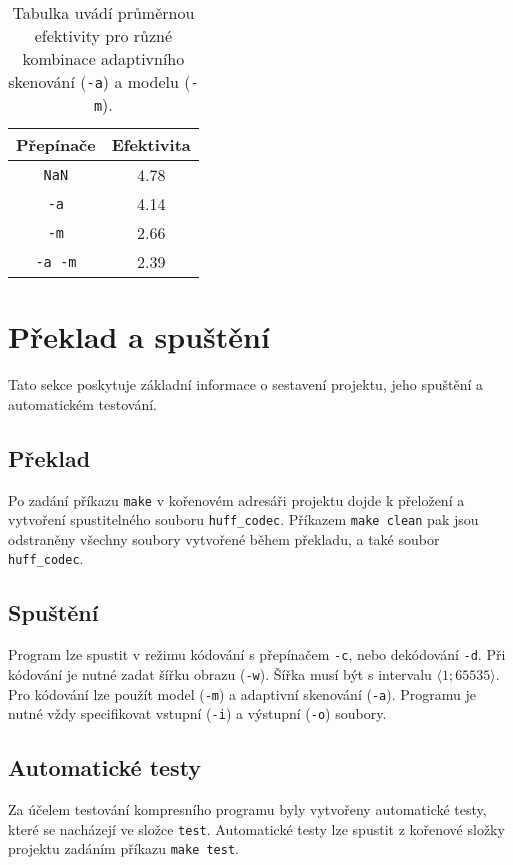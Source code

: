 \documentclass[a4paper, 11pt, fleqn]{scrartcl}
\begin{document}
      \begin{table}[!h]
        \centering
        \captionsetup{justification=justified}
        \begin{tabular}{|c|c|}
          \hline
          Přepínače & Efektivita\\[0.5ex]
          \hline\hline
          \texttt{NaN}   & 4.78\\[0.5ex]
          \texttt{-a}    & 4.14\\[0.5ex]
          \texttt{-m}    & 2.66\\[0.5ex]
          \texttt{-a -m} & 2.39\\[0.5ex]
          \hline
        \end{tabular}
        \caption{Tabulka uvádí průměrnou efektivity pro různé kombinace adaptivního skenování (\texttt{-a}) a modelu (\texttt{-m}).}
      \end{table}

    \section{Překlad a spuštění}
      Tato sekce poskytuje základní informace o sestavení projektu, jeho spuštění a automatickém testování.

      \subsection{Překlad}
        Po zadání příkazu \texttt{make} v kořenovém adresáři projektu dojde k přeložení a vytvoření spustitelného souboru \texttt{huff\_codec}. Příkazem \texttt{make clean} pak jsou odstraněny všechny soubory vytvořené během překladu, a také soubor \texttt{huff\_codec}.

      \subsection{Spuštění}
        Program lze spustit v režimu kódování s přepínačem \texttt{-c}, nebo dekódování \texttt{-d}. Při kódování je nutné zadat šířku obrazu (\texttt{-w}). Šířka musí být s intervalu $\langle 1; 65535 \rangle$. Pro kódování lze použít model (\texttt{-m}) a adaptivní skenování (\texttt{-a}). Programu je nutné vždy specifikovat vstupní (\texttt{-i}) a výstupní (\texttt{-o}) soubory.

      \subsection{Automatické testy}
        Za účelem testování kompresního programu byly vytvořeny automatické testy, které se nacházejí ve složce \texttt{test}. Automatické testy lze spustit z kořenové složky projektu zadáním příkazu \texttt{make test}.
\end{document}

